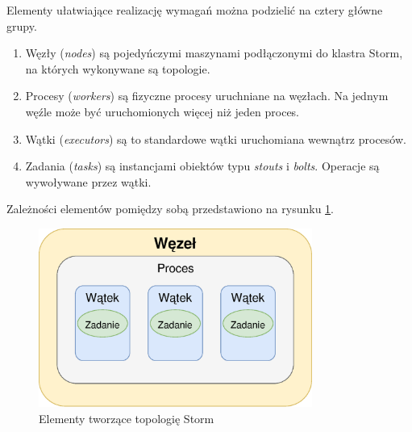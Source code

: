 Elementy ułatwiające realizację wymagań można podzielić na cztery główne grupy.
\begin{enumerate}
  \item Węzły (\textit{nodes}) są pojedyńczymi maszynami podłączonymi do klastra Storm,
  na których wykonywane są topologie.
  \item Procesy (\textit{workers}) są fizyczne procesy uruchniane na węzłach.
  Na jednym węźle może być uruchomionych więcej niż jeden proces.
  \item Wątki (\textit{executors}) są to standardowe wątki uruchomiana wewnątrz procesów.
  \item Zadania (\textit{tasks}) są instancjami obiektów typu \textit{stouts} i \textit{bolts}.
  Operacje są wywoływane przez wątki.
\end{enumerate}
Zależności elementów pomiędzy sobą przedstawiono na rysunku \ref{fig:StormParallel}.
\begin{figure}[htbp]
  \centering
  \includegraphics[width=0.8\textwidth]{img/stormElements}
  \caption{Elementy tworzące topologię Storm}
  \label{fig:StormParallel}
\end{figure}

